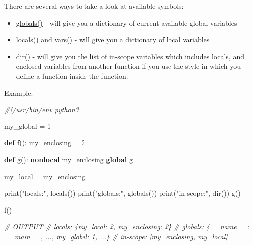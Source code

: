 \documentclass[
]{article}
\newenvironment{Shaded}{}{}
\newcommand{\BuiltInTok}[1]{#1}
\newcommand{\CommentTok}[1]{\textcolor[rgb]{0.38,0.63,0.69}{\textit{#1}}}
\newcommand{\DecValTok}[1]{\textcolor[rgb]{0.25,0.63,0.44}{#1}}
\newcommand{\KeywordTok}[1]{\textcolor[rgb]{0.00,0.44,0.13}{\textbf{#1}}}
\newcommand{\NormalTok}[1]{#1}
\newcommand{\OperatorTok}[1]{\textcolor[rgb]{0.40,0.40,0.40}{#1}}
\newcommand{\StringTok}[1]{\textcolor[rgb]{0.25,0.44,0.63}{#1}}
\begin{document}
There are several ways to take a look at available symbols:

\begin{itemize}
\item
  \href{https://docs.python.org/3/library/functions.html\#globals}{globals()}
  - will give you a dictionary of current available global variables
\item
  \href{https://docs.python.org/3/library/functions.html\#locals}{locals()}
  and
  \href{https://docs.python.org/3/library/functions.html\#vars}{vars()}
  - will give you a dictionary of local variables
\item
  \href{https://docs.python.org/3/library/functions.html\#dir}{dir()} -
  will give you the list of in-scope variables which includes locals,
  and enclosed variables from another function if you use the style in
  which you define a function inside the function.
\end{itemize}

Example:

\begin{Shaded}
\begin{Highlighting}[]
\CommentTok{\#!/usr/bin/env python3}

\NormalTok{my\_global }\OperatorTok{=} \DecValTok{1}

\KeywordTok{def}\NormalTok{ f():}
\NormalTok{  my\_enclosing }\OperatorTok{=} \DecValTok{2}

  \KeywordTok{def}\NormalTok{ g():}
    \KeywordTok{nonlocal}\NormalTok{ my\_enclosing}
    \KeywordTok{global}\NormalTok{ g}

\NormalTok{    my\_local }\OperatorTok{=}\NormalTok{ my\_enclosing}

    \BuiltInTok{print}\NormalTok{(}\StringTok{"locals:"}\NormalTok{, }\BuiltInTok{locals}\NormalTok{())}
    \BuiltInTok{print}\NormalTok{(}\StringTok{"globals:"}\NormalTok{, }\BuiltInTok{globals}\NormalTok{())}
    \BuiltInTok{print}\NormalTok{(}\StringTok{"in{-}scope:"}\NormalTok{, }\BuiltInTok{dir}\NormalTok{())}
\NormalTok{  g()}

\NormalTok{f()}

\CommentTok{\# OUTPUT}
\CommentTok{\#   locals: \{\textquotesingle{}my\_local\textquotesingle{}: 2, \textquotesingle{}my\_enclosing\textquotesingle{}: 2\}}
\CommentTok{\#   globals: \{\textquotesingle{}\_\_name\_\_\textquotesingle{}: \textquotesingle{}\_\_main\_\_\textquotesingle{}, ..., \textquotesingle{}my\_global\textquotesingle{}: 1, ...\}}
\CommentTok{\#   in{-}scope: [\textquotesingle{}my\_enclosing\textquotesingle{}, \textquotesingle{}my\_local\textquotesingle{}]}
\end{Highlighting}
\end{Shaded}
\end{document}
